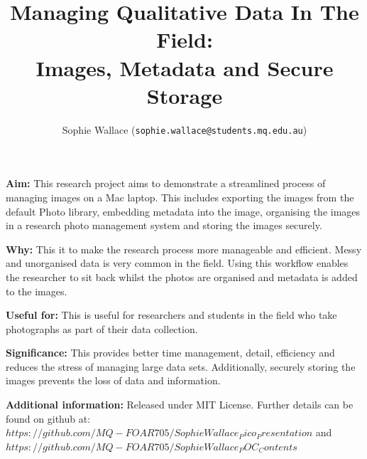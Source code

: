\documentclass[unknownkeysallowed,usepdftitle=false, parskip=full]{beamer}
\title{Managing Qualitative Data In The Field: \\ Images, Metadata and Secure Storage}
\author{Sophie Wallace\inst{1} (\texttt{sophie.wallace@students.mq.edu.au}) \inst{1}}
\institute{\inst{1}Macquarie University, Sydney, NSW}
\newcommand{\secvariable}{nothing}
\newcommand{\mysection}[1]{\renewcommand{\secvariable}{#1}
}
\begin{document}
\mysection{abstract}
\begin{frame}\label{\secvariable}


\parbox{\linewidth}{


\textbf{Aim:} This research project aims to demonstrate a streamlined process of managing images on a Mac laptop. This includes exporting the images from the default Photo library, embedding metadata into the image, organising the images in a research photo management system and storing the images securely. 
\vspace{12pt}

\textbf{Why:} This it to make the research process more manageable and efficient. Messy and unorganised data is very common in the field. Using this workflow enables the researcher to sit back whilst the photos are organised and metadata is added to the images.
\vspace{12pt}

\textbf{Useful for:} This is useful for researchers and students in the field who take photographs as part of their data collection. 
\vspace{12pt}

\textbf{Significance:} This provides better time management, detail, efficiency and reduces the stress of managing large data sets. Additionally, securely storing the images prevents the loss of data and information. 
\vspace{12pt}

\textbf{Additional information:} Released under MIT License. Further details can be found on github at: $https://github.com/MQ-FOAR705/SophieWallace_Pico_Presentation$ and $https://github.com/MQ-FOAR705/SophieWallace_POC_Contents$

}
 
  
\end{frame}
\end{document}
